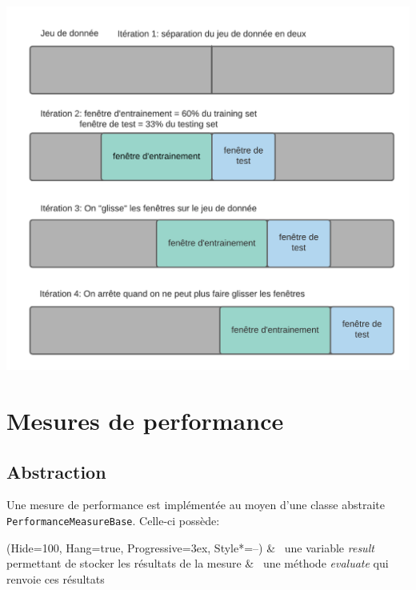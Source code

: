 \begin{center}
\includegraphics[scale=0.25]{figures/Sliding_split.png}
\label{fig9}
\end{center}

\section{Mesures de performance}


\subsection{Abstraction}

Une mesure de performance est implémentée au moyen d’une classe abstraite \texttt{PerformanceMeasureBase}. Celle-ci possède:
\begin{easylist}
\ListProperties(Hide=100, Hang=true, Progressive=3ex, Style*=--)
& ~une variable \textit{result} permettant de stocker les résultats de la mesure
& ~une méthode \textit{evaluate} qui renvoie ces résultats
\end{easylist}

